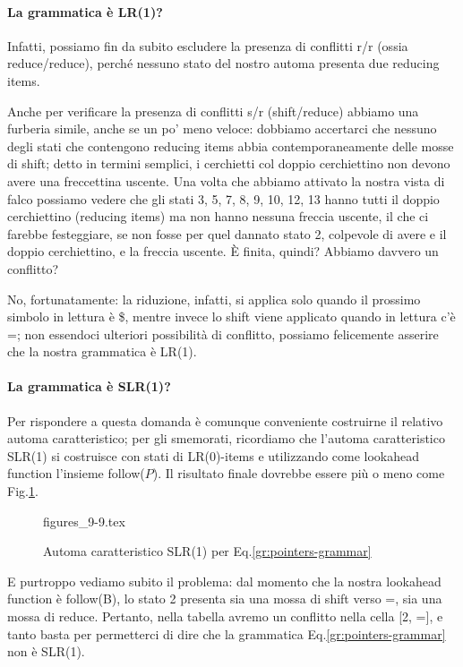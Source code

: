 \documentclass[class=book, crop=false, oneside, 12pt]{standalone}
\begin{document}
\paragraph{La grammatica è LR(1)?}
Infatti, possiamo fin da subito escludere la presenza di conflitti r/r (ossia reduce/reduce), perché nessuno stato del nostro automa presenta due reducing items.

Anche per verificare la presenza di conflitti s/r (shift/reduce) abbiamo una furberia simile, anche se un po' meno veloce: dobbiamo accertarci che nessuno degli stati che contengono reducing items abbia contemporaneamente delle mosse di shift; detto in termini semplici, i cerchietti col doppio cerchiettino non devono avere una freccettina uscente. Una volta che abbiamo attivato la nostra vista di falco possiamo vedere che gli stati 3, 5, 7, 8, 9, 10, 12, 13 hanno tutti il doppio cerchiettino (reducing items) ma non hanno nessuna freccia uscente, il che ci farebbe festeggiare, se non fosse per quel dannato stato 2, colpevole di avere e il doppio cerchiettino, e la freccia uscente. È finita, quindi? Abbiamo davvero un conflitto? 

No, fortunatamente: la riduzione, infatti, si applica solo quando il prossimo simbolo in lettura è \$, mentre invece lo shift viene applicato quando in lettura c'è =; non essendoci ulteriori possibilità di conflitto, possiamo felicemente asserire che la nostra grammatica è LR(1).

\paragraph{La grammatica è SLR(1)?}
Per rispondere a questa domanda è comunque conveniente costruirne il relativo automa caratteristico; per gli smemorati, ricordiamo che l'automa caratteristico SLR(1) si costruisce con stati di LR(0)-items e utilizzando come lookahead function l'insieme follow(\(P\)). Il risultato finale dovrebbe essere più o meno come Fig.\ref{fig:pointers-automaton-slr1}.
\begin{figure}[H]
    \centering
	{figures_9-9.tex}
    \caption{Automa caratteristico SLR(1) per Eq.\ref{gr:pointers-grammar}}
    \label{fig:pointers-automaton-slr1}
\end{figure}
E purtroppo vediamo subito il problema: dal momento che la nostra lookahead function è follow(B), lo stato 2 presenta sia una mossa di shift verso =, sia una mossa di reduce. Pertanto, nella tabella avremo un conflitto nella cella [2, =], e tanto basta per permetterci di dire che la grammatica Eq.\ref{gr:pointers-grammar} non è SLR(1).
\end{document}
